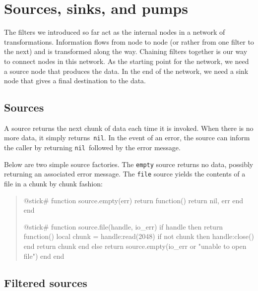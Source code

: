 \documentclass[10pt]{article}
\newcommand{\nil}{\texttt{nil}}
\begin{document}
			\section{Sources, sinks, and pumps}
			
			The filters we introduced so far act as the internal nodes
			in a network of transformations. Information flows from node
			to node (or rather from one filter to the next) and is
			transformed along the way. Chaining filters together is our
			way to connect nodes in this network. As the starting point
			for the network, we need a source node that produces the
			data. In the end of the network, we need a sink node that
			gives a final destination to the data.
			
			\subsection{Sources}
			
			A source returns the next chunk of data each time it is
			invoked. When there is no more data, it simply returns~\nil.  
			In the event of an error, the source can inform the
			caller by returning \nil\ followed by the error message.
			
			Below are two simple source factories. The \texttt{empty} source
			returns no data, possibly returning an associated error
			message. The \texttt{file} source yields the contents of a file 
			in a chunk by chunk fashion:
			\begin{quote}
			\begin{lua}
			@stick#
			function source.empty(err)
            return function()
        return nil, err
            end
			end
			
			@stick#
			function source.file(handle, io_err)
            if handle then 
        return function()
        local chunk = handle:read(2048)
        if not chunk then handle:close() end
        return chunk
        end
            else return source.empty(io_err or "unable to open file") end
			end
			\end{lua}
			\end{quote}
			
			\subsection{Filtered sources}
			
\end{document}
